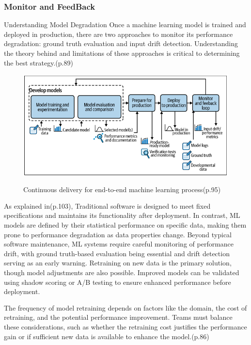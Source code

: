 \subsubsection{Monitor and FeedBack}

Understanding Model Degradation
Once a machine learning model is trained and deployed in production, there are two
approaches to monitor its performance degradation: ground truth evaluation and
input drift detection.
Understanding the theory behind and limitations of these
approaches is critical to determining the best strategy.\cite{treveil2020introducing}(p.89)

\begin{figure}[!htbp]
    \caption{Continuous delivery for end-to-end machine learning process\cite{treveil2020introducing}(p.95)}
    \centering
    \includegraphics[scale=0.4]{images/feedback-loop-intro}
    \label{fig:feedback-loop-intro}
\end{figure}


As explained in\cite{treveil2020introducing}(p.103), Traditional software is designed to meet fixed specifications and maintains its functionality after deployment.
In contrast, ML models are defined by their statistical performance on specific data, making them prone to performance degradation as data properties change.
Beyond typical software maintenance, ML systems require careful monitoring of performance drift,
with ground truth-based evaluation being essential and drift detection serving as an early warning.
Retraining on new data is the primary solution, though model adjustments are also possible.
Improved models can be validated using shadow scoring or A/B testing to ensure enhanced performance before deployment.

The frequency of model retraining depends on factors like the domain, the cost of retraining, and the potential performance improvement.
Teams must balance these considerations, such as whether the retraining cost justifies the performance gain or if sufficient new data is available to enhance the model.\cite{treveil2020introducing}(p.86)

